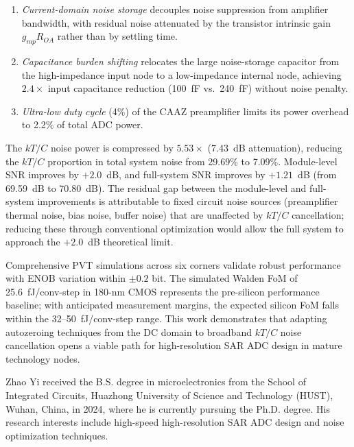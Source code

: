 \documentclass[journal]{IEEEtran}
\begin{document}
\begin{enumerate}
    \item \textit{Current-domain noise storage} decouples noise suppression from amplifier bandwidth, with residual noise attenuated by the transistor intrinsic gain $g_{mp}R_{OA}$ rather than by settling time.
    \item \textit{Capacitance burden shifting} relocates the large noise-storage capacitor from the high-impedance input node to a low-impedance internal node, achieving $2.4\times$ input capacitance reduction (100~fF vs.\ 240~fF) without noise penalty.
    \item \textit{Ultra-low duty cycle} (4\%) of the CAAZ preamplifier limits its power overhead to 2.2\% of total ADC power.
\end{enumerate}

The $kT/C$ noise power is compressed by $5.53\times$ (7.43~dB attenuation), reducing the $kT/C$ proportion in total system noise from 29.69\% to 7.09\%. Module-level SNR improves by $+2.0$~dB, and full-system SNR improves by $+1.21$~dB (from 69.59~dB to 70.80~dB). The residual gap between the module-level and full-system improvements is attributable to fixed circuit noise sources (preamplifier thermal noise, bias noise, buffer noise) that are unaffected by $kT/C$ cancellation; reducing these through conventional optimization would allow the full system to approach the $+2.0$~dB theoretical limit.

Comprehensive PVT simulations across six corners validate robust performance with ENOB variation within $\pm 0.2$ bit. The simulated Walden FoM of 25.6~fJ/conv-step in 180-nm CMOS represents the pre-silicon performance baseline; with anticipated measurement margins, the expected silicon FoM falls within the 32--50~fJ/conv-step range. This work demonstrates that adapting autozeroing techniques from the DC domain to broadband $kT/C$ noise cancellation opens a viable path for high-resolution SAR ADC design in mature technology nodes.

\begin{IEEEbiography}{Zhao Yi} received the B.S. degree in microelectronics from the School of Integrated Circuits, Huazhong University of Science and Technology (HUST), Wuhan, China, in 2024, where he is currently pursuing the Ph.D. degree. His research interests include high-speed high-resolution SAR ADC design and noise optimization techniques.
\end{IEEEbiography}



\end{document}
